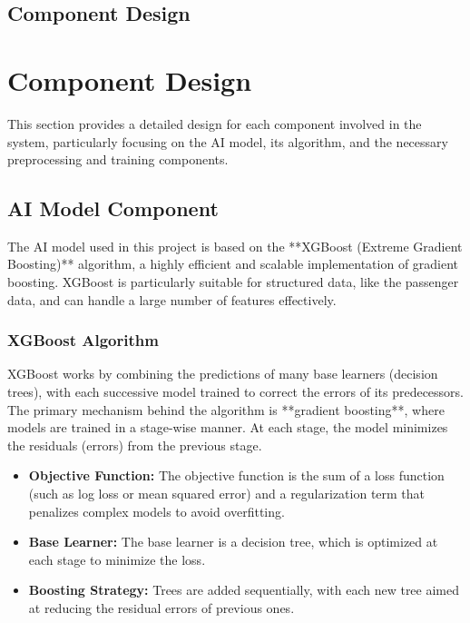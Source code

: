 \documentclass[15pt]{article}
\begin{document}
\subsection{Component Design}
\section{Component Design}

This section provides a detailed design for each component involved in the system, particularly focusing on the AI model, its algorithm, and the necessary preprocessing and training components.

\subsection{AI Model Component}

The AI model used in this project is based on the **XGBoost (Extreme Gradient Boosting)** algorithm, a highly efficient and scalable implementation of gradient boosting. XGBoost is particularly suitable for structured data, like the passenger data, and can handle a large number of features effectively.

\subsubsection{XGBoost Algorithm}

XGBoost works by combining the predictions of many base learners (decision trees), with each successive model trained to correct the errors of its predecessors. The primary mechanism behind the algorithm is **gradient boosting**, where models are trained in a stage-wise manner. At each stage, the model minimizes the residuals (errors) from the previous stage.

\begin{itemize}
    \item \textbf{Objective Function:} The objective function is the sum of a loss function (such as log loss or mean squared error) and a regularization term that penalizes complex models to avoid overfitting.
    \item \textbf{Base Learner:} The base learner is a decision tree, which is optimized at each stage to minimize the loss.
    \item \textbf{Boosting Strategy:} Trees are added sequentially, with each new tree aimed at reducing the residual errors of previous ones.
\end{itemize}
\end{document}
